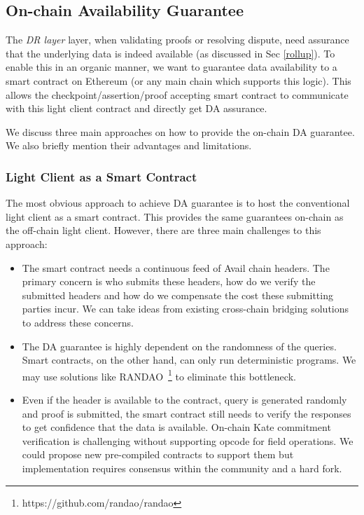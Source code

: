 \documentclass[sigconf, screen=true, nonacm]{acmart}
\newcommand{\DR}{\textit{DR layer}}
\begin{document}
    \subsection{On-chain Availability Guarantee}
        The \DR{} layer, when validating proofs or resolving dispute, need assurance that the underlying data is indeed available (as discussed in Sec \ref{rollup}). To enable this in an organic manner, we want to guarantee data availability to a smart contract on Ethereum (or any main chain which supports this logic). This allows the checkpoint/assertion/proof accepting smart contract to communicate with this light client contract and directly get DA assurance. 

        We discuss three main approaches on how to provide the on-chain DA guarantee. We also briefly mention their advantages and limitations. 

        \subsubsection{Light Client as a Smart Contract}
            The most obvious approach to achieve DA guarantee is to host the conventional light client as a smart contract. This provides the same guarantees on-chain as the off-chain light client. However, there are three main challenges to this approach:
            \begin{itemize}
                \item The smart contract needs a continuous feed of Avail chain headers. The primary concern is who submits these headers, how do we verify the submitted headers and how do we compensate the cost these submitting parties incur. We can take ideas from existing cross-chain bridging solutions to address these concerns. 
                \item The DA guarantee is highly dependent on the randomness of the queries. Smart contracts, on the other hand, can only run deterministic programs. We may use solutions like RANDAO~\footnote{https://github.com/randao/randao} to eliminate this bottleneck. 
                \item Even if the header is available to the contract, query is generated randomly and proof is submitted, the smart contract still needs to verify the responses to get confidence that the data is available. On-chain Kate commitment verification is challenging without supporting opcode for field operations. We could propose new pre-compiled contracts to support them but implementation requires consensus within the community and a hard fork.  
            \end{itemize}
        
\end{document}
